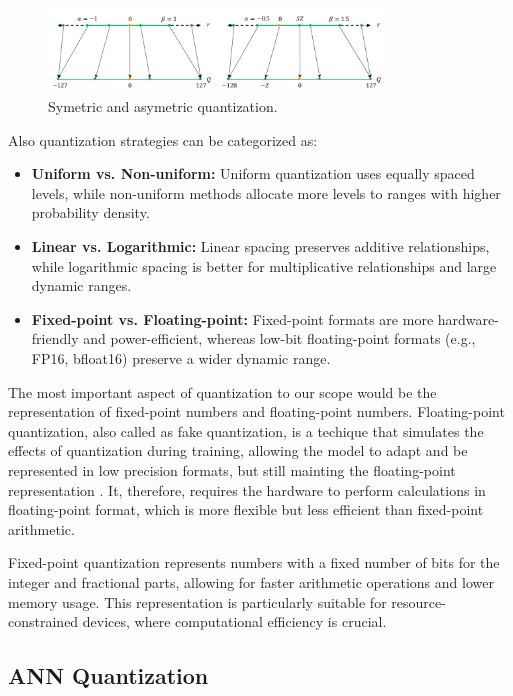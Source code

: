 \newpage
\begin{figure}
\centering
\includegraphics[width=0.8\textwidth]{figuras/2-fundamentos/quantization symetric.png}
\caption{Symetric and asymetric quantization.}
\label{fig:symmetric_quantization}
\end{figure}


Also quantization strategies can be categorized as:
\begin{itemize}
    \item \textbf{Uniform vs. Non-uniform:} Uniform quantization uses equally spaced levels, while non-uniform methods allocate more levels to ranges with higher probability density.
    \item \textbf{Linear vs. Logarithmic:} Linear spacing preserves additive relationships, while logarithmic spacing is better for multiplicative relationships and large dynamic ranges.
    \item \textbf{Fixed-point vs. Floating-point:} Fixed-point formats are more hardware-friendly and power-efficient, whereas low-bit floating-point formats (e.g., FP16, bfloat16) preserve a wider dynamic range.
\end{itemize}


The most important aspect of quantization to our scope would be the representation of fixed-point numbers and floating-point numbers. Floating-point quantization, also called as fake quantization, is a techique that simulates the effects of quantization during training, allowing the model to adapt and be represented in low precision formats, but still mainting the floating-point representation \cite{Zhu2020Survey}. It, therefore, requires the hardware to perform calculations in floating-point format, which is more flexible but less efficient than fixed-point arithmetic.

Fixed-point quantization represents numbers with a fixed number of bits for the integer and fractional parts, allowing for faster arithmetic operations and lower memory usage. This representation is particularly suitable for resource-constrained devices, where computational efficiency is crucial.

\subsection{ANN Quantization}


